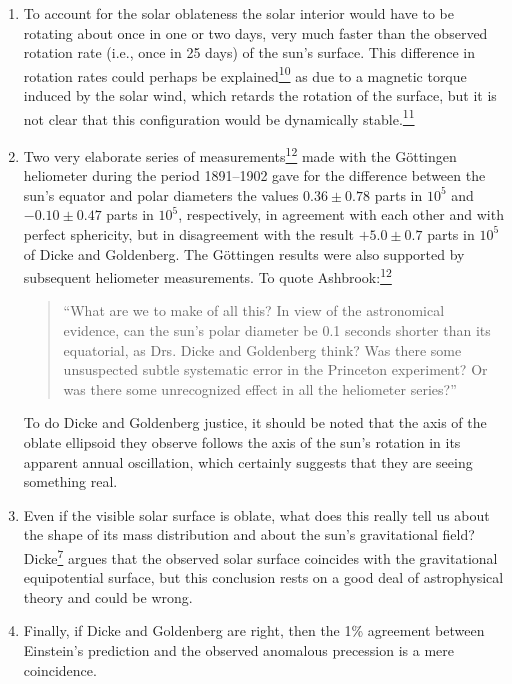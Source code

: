 \begin{enumerate}
  \item[(A)] To account for the solar oblateness the solar interior would
  have to be rotating about once in one or two days, very much faster than
  the observed rotation rate (i.e., once in 25 days) of the sun's surface.
  This difference in rotation rates could perhaps be
  explained\hyperref[ch8-ref-10]{\textsuperscript{10}} as due to a
  magnetic torque induced by the solar wind, which retards the rotation of
  the surface, but it is not clear that this configuration would be
  dynamically stable.\hyperref[ch8-ref-11]{\textsuperscript{11}}

  \item[(B)] Two very elaborate series of
  measurements\hyperref[ch8-ref-12]{\textsuperscript{12}} made with the
  G\"ottingen heliometer during the period 1891--1902 gave for the
  difference between the sun's equator and polar diameters the values
  \(0.36\pm0.78\) parts in \(10^5\) and \(-0.10\pm0.47\) parts in
  \(10^5\), respectively, in agreement with each other and with perfect
  sphericity, but in disagreement with the result \(+5.0\pm0.7\) parts in
  \(10^5\) of Dicke and Goldenberg. The G\"ottingen results were also
  supported by subsequent heliometer measurements. To quote
  Ashbrook:\hyperref[ch8-ref-12]{\textsuperscript{12}}
  \begin{quote}
  ``What are we to make of all this? In view of the astronomical evidence,
  can the sun's polar diameter be 0.1 seconds shorter than its equatorial,
  as Drs. Dicke and Goldenberg think? Was there some unsuspected subtle
  systematic error in the Princeton experiment? Or was there some
  unrecognized effect in all the heliometer series?''
  \end{quote}

  To do Dicke and Goldenberg justice, it should be noted that the axis of
  the oblate ellipsoid they observe follows the axis of the sun's rotation
  in its apparent annual oscillation, which certainly suggests that they
  are seeing something real.

  \item[(C)] Even if the visible solar surface is oblate, what does this
  really tell us about the shape of its mass distribution and about the
  sun's gravitational field? Dicke\hyperref[ch8-ref-7]{\textsuperscript{7}}
  argues that the observed solar surface coincides with the gravitational
  equipotential surface, but this conclusion rests on a good deal of
  astrophysical theory and could be wrong.

  \item[(D)] Finally, if Dicke and Goldenberg are right, then the 1\%
  agreement between Einstein's prediction and the observed anomalous
  precession is a mere coincidence.
\end{enumerate}
